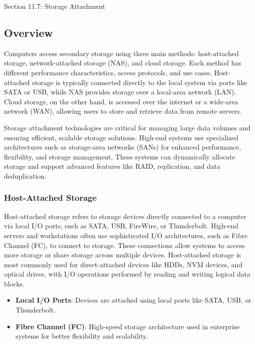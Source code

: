 \begin{notes}{Section 11.7: Storage Attachment}

    \subsection*{Overview}
    
    Computers access secondary storage using three main methods: host-attached storage, network-attached storage (NAS), and cloud storage. Each method has different performance characteristics, 
    access protocols, and use cases. Host-attached storage is typically connected directly to the local system via ports like SATA or USB, while NAS provides storage over a local-area network (LAN). 
    Cloud storage, on the other hand, is accessed over the internet or a wide-area network (WAN), allowing users to store and retrieve data from remote servers.
    
    Storage attachment technologies are critical for managing large data volumes and ensuring efficient, scalable storage solutions. High-end systems use specialized architectures such as storage-area 
    networks (SANs) for enhanced performance, flexibility, and storage management. These systems can dynamically allocate storage and support advanced features like RAID, replication, and data 
    deduplication.

    \subsubsection*{Host-Attached Storage}
    
    Host-attached storage refers to storage devices directly connected to a computer via local I/O ports, such as SATA, USB, FireWire, or Thunderbolt. High-end servers and workstations often use 
    sophisticated I/O architectures, such as Fibre Channel (FC), to connect to storage. These connections allow systems to access more storage or share storage across multiple devices. Host-attached 
    storage is most commonly used for direct-attached devices like HDDs, NVM devices, and optical drives, with I/O operations performed by reading and writing logical data blocks.
    
    \begin{highlight}
    
        \begin{itemize}
            \item \textbf{Local I/O Ports}: Devices are attached using local ports like SATA, USB, or Thunderbolt.
            \item \textbf{Fibre Channel (FC)}: High-speed storage architecture used in enterprise systems for better flexibility and scalability.
        \end{itemize}
    

\end{highlight}
\end{notes}
